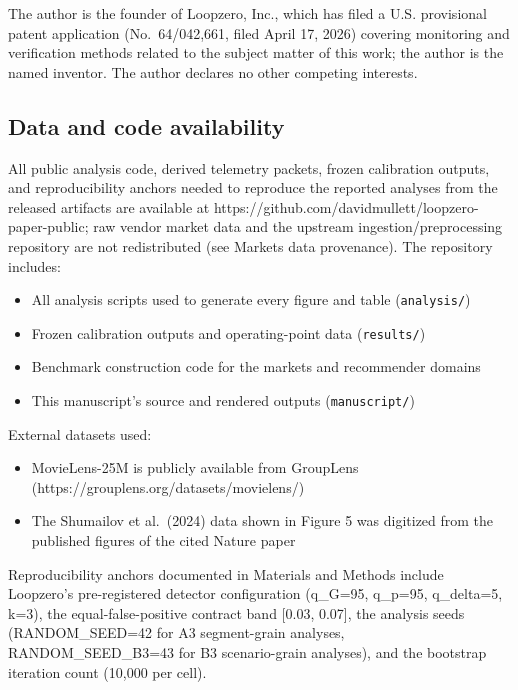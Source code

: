 \documentclass[
  11pt,
]{article}
\providecommand{\tightlist}{%
  \setlength{\itemsep}{0pt}\setlength{\parskip}{0pt}}
\begin{document}
The author is the founder of Loopzero, Inc., which has filed a U.S.
provisional patent application (No.~64/042,661, filed April 17, 2026)
covering monitoring and verification methods related to the subject
matter of this work; the author is the named inventor. The author
declares no other competing interests.

\subsection{Data and code
availability}\label{data-and-code-availability}

All public analysis code, derived telemetry packets, frozen calibration
outputs, and reproducibility anchors needed to reproduce the reported
analyses from the released artifacts are available at
https://github.com/davidmullett/loopzero-paper-public; raw vendor market
data and the upstream ingestion/preprocessing repository are not
redistributed (see Markets data provenance). The repository includes:

\begin{itemize}
\tightlist
\item
  All analysis scripts used to generate every figure and table
  (\texttt{analysis/})
\item
  Frozen calibration outputs and operating-point data
  (\texttt{results/})
\item
  Benchmark construction code for the markets and recommender domains
\item
  This manuscript's source and rendered outputs (\texttt{manuscript/})
\end{itemize}

External datasets used:

\begin{itemize}
\tightlist
\item
  MovieLens-25M is publicly available from GroupLens
  (https://grouplens.org/datasets/movielens/)
\item
  The Shumailov et al.~(2024) data shown in Figure 5 was digitized from
  the published figures of the cited Nature paper
\end{itemize}

Reproducibility anchors documented in Materials and Methods include
Loopzero's pre-registered detector configuration (q\_G=95, q\_p=95,
q\_delta=5, k=3), the equal-false-positive contract band {[}0.03,
0.07{]}, the analysis seeds (RANDOM\_SEED=42 for A3 segment-grain
analyses, RANDOM\_SEED\_B3=43 for B3 scenario-grain analyses), and the
bootstrap iteration count (10,000 per cell).
\end{document}
